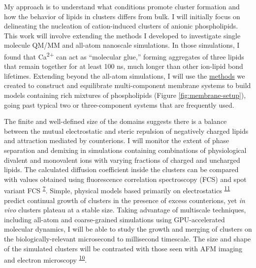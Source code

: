 \documentclass[11pt,notitlepage]{article}
\providecommand{\DIFaddtex}[1]{{\protect\color{blue}\uwave{#1}}} %
\providecommand{\DIFaddbegin}{} %
\providecommand{\DIFaddend}{} %
\providecommand{\DIFdelbegin}{} %
\providecommand{\DIFdelend}{} %
\providecommand{\DIFadd}[1]{\texorpdfstring{\DIFaddtex{#1}}{#1}} %
\newcommand{\DIFscaledelfig}{0.5}
\newlength{\DIFdelgraphicswidth} %
\newlength{\DIFdelgraphicsheight} %
\newcommand{\DIFaddincludegraphics}[2][]{{\color{blue}\fbox{\DIFOincludegraphics[#1]{#2}}}} %
\newcommand{\DIFdelincludegraphics}[2][]{%
\sbox{\DIFdelgraphicsbox}{\DIFOincludegraphics[#1]{#2}}%
\settoboxwidth{\DIFdelgraphicswidth}{\DIFdelgraphicsbox} %
\settoboxtotalheight{\DIFdelgraphicsheight}{\DIFdelgraphicsbox} %
\scalebox{\DIFscaledelfig}{%
\parbox[b]{\DIFdelgraphicswidth}{\usebox{\DIFdelgraphicsbox}\\[-\baselineskip] \rule{\DIFdelgraphicswidth}{0em}}\llap{\resizebox{\DIFdelgraphicswidth}{\DIFdelgraphicsheight}{%
\setlength{\unitlength}{\DIFdelgraphicswidth}%
\begin{picture}(1,1)%
\thicklines\linethickness{2pt} %
{\color[rgb]{1,0,0}\put(0,0){\framebox(1,1){}}}%
{\color[rgb]{1,0,0}\put(0,0){\line( 1,1){1}}}%
{\color[rgb]{1,0,0}\put(0,1){\line(1,-1){1}}}%
\end{picture}%
}\hspace*{3pt}}} %
} %
\DeclareRobustCommand{\DIFaddbegin}{\DIFOaddbegin \let\includegraphics\DIFaddincludegraphics} %
\DeclareRobustCommand{\DIFaddend}{\DIFOaddend \let\includegraphics\DIFOincludegraphics} %
\DeclareRobustCommand{\DIFdelbegin}{\DIFOdelbegin \let\includegraphics\DIFdelincludegraphics} %
\DeclareRobustCommand{\DIFdelend}{\DIFOaddend \let\includegraphics\DIFOincludegraphics} %
\begin{document}
My approach is to understand what conditions promote cluster formation
and how the behavior of lipids in clusters differs from bulk. I will
initially focus on delineating the nucleation of cation-induced clusters
of anionic phospholipids. This work will involve extending the methods I
developed to investigate single molecule QM/MM and all-atom nanoscale
simulations. In those simulations, I found that Ca\textsuperscript{2+}
can act as ``molecular glue,'' forming aggregates of three lipids that
remain together for at least 100 ns, much longer than other ion-lipid
bond lifetimes. Extending beyond the all-atom simulations, I will use
the \href{https://github.com/biophyscode}{methods} we created to
construct and equilibrate multi-component membrane systems to build
models containing rich mixtures of phospholipids (Figure
\ref{fig:membrane-setup}), going past typical two or three-component
systems that are frequently used.

The finite and well-defined size of the \DIFaddbegin \DIFadd{experimentally-characterized
}\DIFaddend domains suggests there is a balance between the mutual electrostatic and
steric repulsion of negatively charged lipids and attraction mediated by
counterions. I will monitor the extent of phase separation and demixing
in simulations containing combinations of physiological divalent and
monovalent ions with varying fractions of charged and uncharged lipids.
The calculated diffusion coefficient inside the clusters can be compared
with values obtained using fluorescence correlation spectroscopy (FCS)
and spot variant
FCS\textsuperscript{\protect\DIFdelbegin %
\DIFdelend \DIFaddbegin \hyperlink{ref-oBaB5Z87}{7}\DIFaddend }. Simple,
physical models based primarily on
electrostatics\textsuperscript{\protect\DIFdelbegin %
\DIFdelend \DIFaddbegin \hyperlink{ref-10CqL9t0a}{11}\DIFaddend }
predict continual growth of clusters in the presence of excess
counterions, yet \emph{in vivo} clusters plateau at a stable size.
Taking advantage of multiscale techniques, including all-atom and
coarse-grained simulations using GPU-accelerated molecular dynamics, I
will be able to study the growth and merging of clusters on the
biologically-relevant microsecond to millisecond timescale. The size and
shape of the simulated clusters will be contrasted with those seen with
AFM imaging and electron
microscopy\textsuperscript{\protect\DIFdelbegin %
\DIFdelend \DIFaddbegin \hyperlink{ref-LhOwGz4k}{10}\DIFaddend }.
\end{document}
